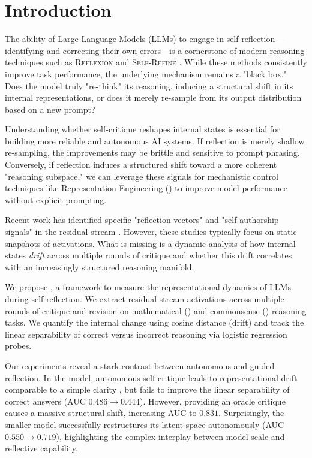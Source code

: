 \section{Introduction}
\label{sec:introduction}

The ability of Large Language Models (LLMs) to engage in self-reflection—identifying and correcting their own errors—is a cornerstone of modern reasoning techniques such as \textsc{Reflexion} \citep{shinn2023reflexion} and \textsc{Self-Refine} \citep{madaan2023selfrefine}. While these methods consistently improve task performance, the underlying mechanism remains a "black box." Does the model truly "re-think" its reasoning, inducing a structural shift in its internal representations, or does it merely re-sample from its output distribution based on a new prompt?

 Understanding whether self-critique reshapes internal states is essential for building more reliable and autonomous AI systems. If reflection is merely shallow re-sampling, the improvements may be brittle and sensitive to prompt phrasing. Conversely, if reflection induces a structured shift toward a more coherent "reasoning subspace," we can leverage these signals for mechanistic control techniques like Representation Engineering (\repe) \citep{yan2025reflctrl} to improve model performance without explicit prompting.

 Recent work has identified specific "reflection vectors" and "self-authorship signals" in the residual stream \citep{zhu2025emergencecontrol,ackerman2024inspection}. However, these studies typically focus on static snapshots of activations. What is missing is a dynamic analysis of how internal states \textit{drift} across multiple rounds of critique and whether this drift correlates with an increasingly structured reasoning manifold.

 We propose \methodname, a framework to measure the representational dynamics of LLMs during self-reflection. We extract residual stream activations across multiple rounds of critique and revision on mathematical (\gsm) and commonsense (\csqa) reasoning tasks. We quantify the internal change using cosine distance (drift) and track the linear separability of correct versus incorrect reasoning via logistic regression probes.

 Our experiments reveal a stark contrast between autonomous and guided reflection. In the \qwenonefive model, autonomous self-critique leads to representational drift comparable to a simple clarity \rewrite, but fails to improve the linear separability of correct answers (AUC $0.486 \rightarrow 0.444$). However, providing an \external oracle critique causes a massive structural shift, increasing AUC to $0.831$. Surprisingly, the smaller \qwenzerofive model successfully restructures its latent space autonomously (AUC $0.550 \rightarrow 0.719$), highlighting the complex interplay between model scale and reflective capability.

